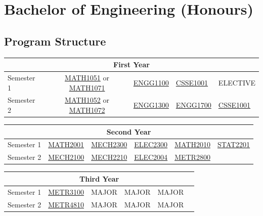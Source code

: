 \documentclass[a4paper,12pt]{report}
\begin{document}
\section{Bachelor of Engineering (Honours)}
\subsection{Program Structure}
\renewcommand{\arraystretch}{1.5}
\begin{table}[H]
    \centering
    \begin{tabular}{| m{6em} | m{5em} m{5em} m{5em} m{5em} m{5em} |}
        \hline
        \multicolumn{6}{|c|}{\bfseries First Year} \\
        \hline
        Semester 1 & \multicolumn{2}{c}{\hyperlink{MATH1051}{MATH1051} or \hyperlink{MATH1071}{MATH1071}} & \hyperlink{ENGG1100}{ENGG1100} & \hyperlink{CSSE1001}{CSSE1001} & ELECTIVE \\
        Semester 2 & \multicolumn{2}{c}{\hyperlink{MATH1052}{MATH1052} or \hyperlink{MATH1072}{MATH1072}} & \hyperlink{ENGG1300}{ENGG1300} & \hyperlink{ENGG1700}{ENGG1700} & \hyperlink{CSSE1001}{CSSE1001} \\
        \hline
    \end{tabular}
\end{table}
\begin{table}[H]
    \centering
    \begin{tabular}{| m{6em} | m{5em} m{5em} m{5em} m{5em} m{5em} |}
        \hline
        \multicolumn{6}{|c|}{\bfseries Second Year} \\
        \hline
        Semester 1 & \hyperlink{MATH2001}{MATH2001} & \hyperlink{MECH2300}{MECH2300} & \hyperlink{ELEC2300}{ELEC2300} & \hyperlink{MATH2010}{MATH2010} & \hyperlink{STAT2201}{STAT2201} \\
        Semester 2 & \hyperlink{MECH2100}{MECH2100} & \hyperlink{MECH2210}{MECH2210} & \hyperlink{ELEC2004}{ELEC2004} & \hyperlink{METR2800}{METR2800} & \\
        \hline
    \end{tabular}
\end{table}
\begin{table}[H]
    \centering
    \begin{tabular}{| m{6em} | m{5em} m{5em} m{5em} m{5em} m{5em} |}
        \hline
        \multicolumn{6}{|c|}{\bfseries Third Year} \\
        \hline
        Semester 1 & \hyperlink{METR3100}{METR3100} & MAJOR & MAJOR & MAJOR & \\
        Semester 2 & \hyperlink{METR4810}{METR4810} & MAJOR & MAJOR & MAJOR & \\
        \hline
    \end{tabular}
\end{table}
\end{document}
